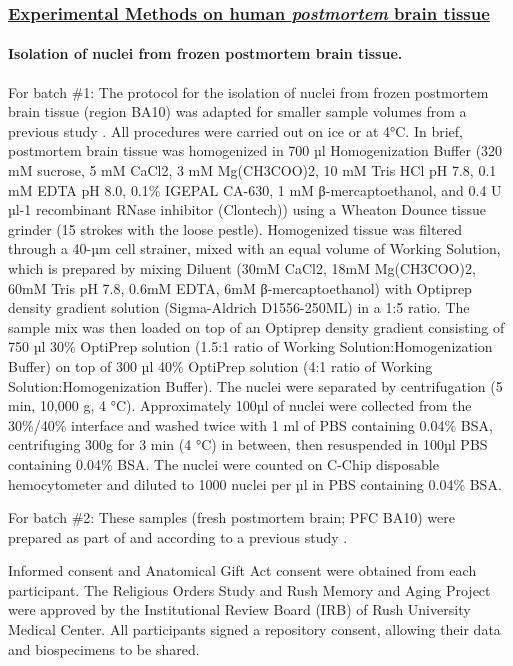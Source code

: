 \subsubsection{\underline{Experimental Methods on human \textit{postmortem} brain tissue}}

\paragraph{Isolation of nuclei from frozen postmortem brain tissue.}
For batch \#1: The protocol for the isolation of nuclei from frozen postmortem brain tissue (region BA10) was adapted for smaller sample volumes from a previous study \cite{Mathys2019-wb}. All procedures were carried out on ice or at 4°C. In brief, postmortem brain tissue was homogenized in 700 µl Homogenization Buffer (320 mM sucrose, 5 mM CaCl2, 3 mM Mg(CH3COO)2, 10 mM Tris HCl pH 7.8, 0.1 mM EDTA pH 8.0, 0.1\% IGEPAL CA-630, 1 mM β-mercaptoethanol, and 0.4 U µl-1 recombinant RNase inhibitor (Clontech)) using a Wheaton Dounce tissue grinder (15 strokes with the loose pestle). Homogenized tissue was filtered through a 40-µm cell strainer, mixed with an equal volume of Working Solution, which is prepared by mixing Diluent (30mM CaCl2, 18mM Mg(CH3COO)2, 60mM Tris pH 7.8, 0.6mM EDTA, 6mM β-mercaptoethanol) with Optiprep density gradient solution (Sigma-Aldrich D1556-250ML) in a 1:5 ratio. The sample mix was then loaded on top of an Optiprep density gradient consisting of 750 µl 30\% OptiPrep solution (1.5:1 ratio of Working Solution:Homogenization Buffer) on top of 300 µl 40\% OptiPrep solution (4:1 ratio of Working Solution:Homogenization Buffer). The nuclei were separated by centrifugation (5 min, 10,000 g, 4 °C). Approximately 100µl of nuclei were collected from the 30\%/40\% interface and washed twice with 1 ml of PBS containing 0.04\% BSA, centrifuging 300g for 3 min (4 °C) in between, then resuspended in 100µl PBS containing 0.04\% BSA. The nuclei were counted on C-Chip disposable hemocytometer and diluted to 1000 nuclei per µl in PBS containing 0.04\% BSA. 

For batch \#2: These samples (fresh postmortem brain; PFC BA10) were prepared as part of and according to a previous study \cite{Mathys2019-wb}.

Informed consent and Anatomical Gift Act consent were obtained from each participant. The Religious Orders Study and Rush Memory and Aging Project were approved by the Institutional Review Board (IRB) of Rush University Medical Center. All participants signed a repository consent, allowing their data and biospecimens to be shared.


